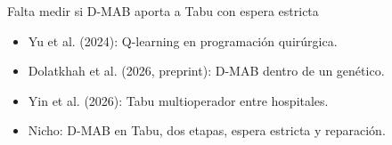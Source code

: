 \documentclass[aspectratio=169,11pt]{beamer}
\begin{document}
\begin{frame}{Falta medir si D-MAB aporta a Tabu con espera estricta}
  \begin{itemize}
    \item Yu et al. (2024): Q-learning en programación quirúrgica.
    \item Dolatkhah et al. (2026, preprint): D-MAB dentro de un genético.
    \item Yin et al. (2026): Tabu multioperador entre hospitales.
    \item Nicho: D-MAB en Tabu, dos etapas, espera estricta y reparación.
  \end{itemize}
  \vspace{0.25cm}
\end{frame}
\end{document}
